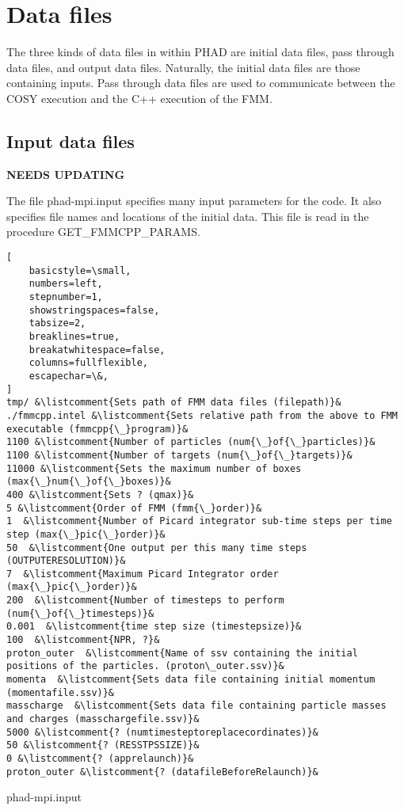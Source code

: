 \documentclass[oneside,12pt]{book}
\newcommand*{\listcomment}[1]{\hfill\makebox[12.0cm][l]{#1}}%
\begin{document}
\clearpage

\section{Data files}
\label{sec:DataFiles}

The three kinds of data files in within PHAD are initial data files, pass through data files, and output data files.  Naturally, the initial data files are those containing inputs.  Pass through data files are used to communicate between the COSY execution and the C++ execution of the FMM.  

\subsection{Input data files}

{\bf\color{red} NEEDS UPDATING}

The file phad-mpi.input specifies many input parameters for the code.  It also specifies file names and locations of the initial data.  This file is read in the procedure GET{\_}FMMCPP{\_}PARAMS. 

\begin{datafile}
\begin{lstlisting}[
    basicstyle=\small,
    numbers=left,
    stepnumber=1,
    showstringspaces=false,
    tabsize=2,
    breaklines=true,
    breakatwhitespace=false,
    columns=fullflexible,
    escapechar=\&,    
]
tmp/ &\listcomment{Sets path of FMM data files (filepath)}&
./fmmcpp.intel &\listcomment{Sets relative path from the above to FMM executable (fmmcpp{\_}program)}&
1100 &\listcomment{Number of particles (num{\_}of{\_}particles)}&
1100 &\listcomment{Number of targets (num{\_}of{\_}targets)}&
11000 &\listcomment{Sets the maximum number of boxes (max{\_}num{\_}of{\_}boxes)}&
400 &\listcomment{Sets ? (qmax)}&
5 &\listcomment{Order of FMM (fmm{\_}order)}&                            
1  &\listcomment{Number of Picard integrator sub-time steps per time step (max{\_}pic{\_}order)}&
50  &\listcomment{One output per this many time steps (OUTPUTERESOLUTION)}&
7  &\listcomment{Maximum Picard Integrator order (max{\_}pic{\_}order)}&
200  &\listcomment{Number of timesteps to perform (num{\_}of{\_}timesteps)}&
0.001  &\listcomment{time step size (timestepsize)}&
100  &\listcomment{NPR, ?}&
proton_outer  &\listcomment{Name of ssv containing the initial positions of the particles. (proton\_outer.ssv)}&
momenta  &\listcomment{Sets data file containing initial momentum (momentafile.ssv)}&
masscharge  &\listcomment{Sets data file containing particle masses and charges (masschargefile.ssv)}&
5000 &\listcomment{? (numtimesteptoreplacecordinates)}&
50 &\listcomment{? (RESSTPSSIZE)}&
0 &\listcomment{? (apprelaunch)}&
proton_outer &\listcomment{? (datafileBeforeRelaunch)}&
\end{lstlisting}
\caption{phad-mpi.input}
\label{df:phad-mpi.input}
\end{datafile}
\end{document}
